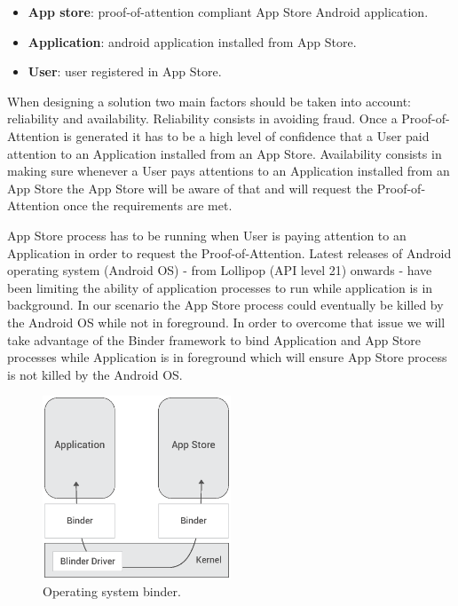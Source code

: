 \begin{itemize}
\item {\bf App store}: proof-of-attention compliant App Store Android application.
\item {\bf Application}: android application installed from App Store.
\item {\bf User}: user registered in App Store.
\end{itemize}

When designing a solution two main factors should be taken into account: reliability and availability. Reliability consists in avoiding fraud. Once a Proof-of-Attention is generated it has to be a high level of confidence that a User paid attention to an Application installed from an App Store. Availability consists in making sure whenever a User pays attentions to an Application installed from an App Store the App Store will be aware of that and will request the Proof-of-Attention once the requirements are met.

App Store process has to be running when User is paying attention to an Application in order to request  the Proof-of-Attention. Latest releases of Android operating system (Android OS) - from Lollipop (API level 21) onwards - have been limiting the ability of application processes to run while application is in background. In our scenario the App Store process could eventually be killed by the Android OS while not in foreground. In order to overcome that issue we will take advantage of the Binder framework to bind Application and App Store processes while Application is in foreground which will ensure App Store process is not killed by the Android OS.

\begin{figure}[!ht]
\centering
\includegraphics[width=0.5\textwidth]{diagrams/binder_diagram.eps}
\caption{Operating system binder.}
\label{fig:binder}
\end{figure}

